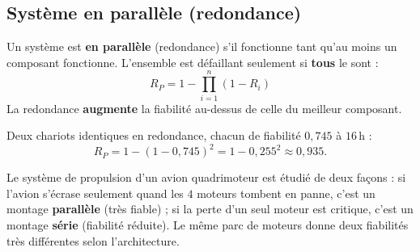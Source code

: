 \documentclass[a4paper,11pt]{article}
\begin{document}
\subsection{Système en parallèle (redondance)}

\begin{theoreme}
Un système est \textbf{en parallèle} (redondance) s'il fonctionne tant qu'au moins un composant fonctionne. L'ensemble est défaillant seulement si \textbf{tous} le sont :
\[
\boxed{R_{P} = 1 - \prod_{i=1}^{n} (1 - R_i)}
\]
La redondance \textbf{augmente} la fiabilité au-dessus de celle du meilleur composant.
\end{theoreme}

\begin{exemple}
Deux chariots identiques en redondance, chacun de fiabilité $0{,}745$ à $16$\,h :
\[
R_P = 1 - (1 - 0{,}745)^2 = 1 - 0{,}255^2 \approx 0{,}935.
\]
\end{exemple}

\begin{center}
\end{center}

\begin{appliindus}
Le système de propulsion d'un avion quadrimoteur est étudié de deux façons : si l'avion s'écrase seulement quand les $4$ moteurs tombent en panne, c'est un montage \textbf{parallèle} (très fiable) ; si la perte d'un seul moteur est critique, c'est un montage \textbf{série} (fiabilité réduite). Le même parc de moteurs donne deux fiabilités très différentes selon l'architecture.
\end{appliindus}
\end{document}
